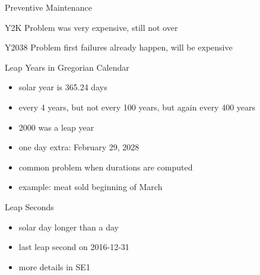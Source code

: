 \begin{frame}{Preventive Maintenance}
	\begin{fancycolumns}
		\begin{definition}{\insertsubsection\mysource{\lientzswanson}}
			 \hfill {}
		\end{definition}
		\begin{example}{Y2K Problem}
			was very expensive, still not over
		\end{example}
		\begin{example}{Y2038 Problem}
			first failures already happen, will be expensive
		\end{example}
		\nextcolumn
		\begin{example}{Leap Years in Gregorian Calendar}
			\begin{itemize}
				\item solar year is 365.24 days
				\item every 4 years, but not every 100 years, but again every 400 years
				\item 2000 was a leap year
				\item one day extra: February 29, 2028
				\item common problem when durations are computed
				\item example: meat sold beginning of March
			\end{itemize}
		\end{example}
		\begin{example}{Leap Seconds}
			\begin{itemize}
				\item solar day longer than a day
				\item last leap second on 2016-12-31
				\item more details in SE1
			\end{itemize}
			\centering{}
		\end{example}
	\end{fancycolumns}
\end{frame}




